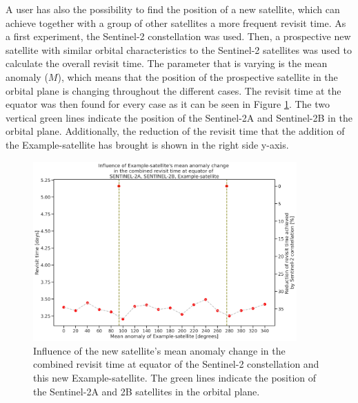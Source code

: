 A user has also the possibility to find the position of a new satellite, which can achieve together with a group of other satellites a more frequent revisit time. As a first experiment, the Sentinel-2 constellation was used. Then, a prospective new satellite with similar orbital characteristics to the Sentinel-2 satellites was used to calculate the overall revisit time. The parameter that is varying is the mean anomaly ($M$), which means that the position of the prospective satellite in the orbital plane is changing throughout the different cases. The revisit time at the equator was then found for every case as it can be seen in Figure \ref{revisit_time_ofdoubleaxis_SENTINEL-2A_SENTINEL-2B_Example-satellite}. The two vertical green lines indicate the position of the Sentinel-2A and Sentinel-2B  in the orbital plane. Additionally, the reduction of the revisit time that the addition of the Example-satellite has brought is shown in the right side y-axis.


\begin{figure}
\centering
\includegraphics[width=0.9\textwidth]{Images/revisit_time_ofdoubleaxis_SENTINEL-2A_SENTINEL-2B_Example-satellite.png}
\caption{Influence of the new satellite's mean anomaly change in the combined revisit time at equator of the Sentinel-2 constellation and this new Example-satellite. The green lines indicate the position of the Sentinel-2A and 2B satellites in the orbital plane.}
\label{revisit_time_ofdoubleaxis_SENTINEL-2A_SENTINEL-2B_Example-satellite}
\end{figure}

